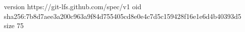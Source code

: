 version https://git-lfs.github.com/spec/v1
oid sha256:7b8d7aee3a200c963a9f84d755405cd8e0e4c7d5c159428f16e1e6d4b40393d5
size 75
